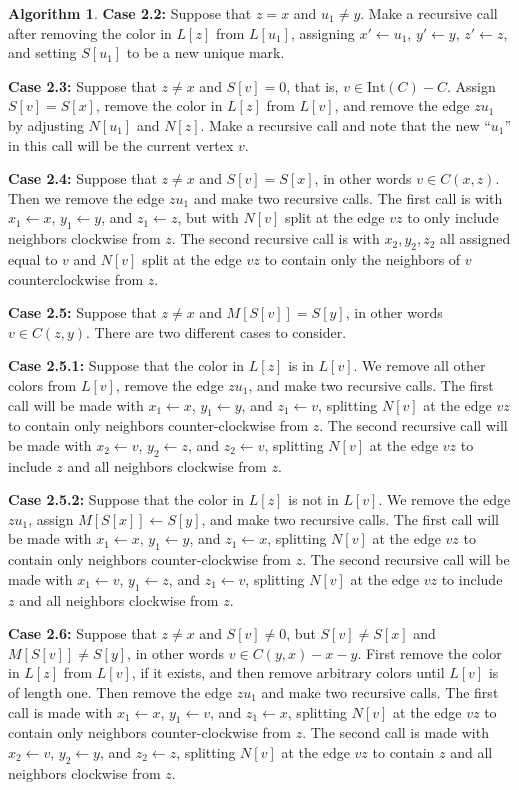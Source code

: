 \documentclass[12pt,letterpaper]{article}
\theoremstyle{plain}
\theoremstyle{definition}
\theoremstyle{break}
\newtheorem{algorithm}[lemma]{Algorithm}     %
\begin{document}
\begin{algorithm}
\textbf{Case 2.2:} Suppose that $z=x$ and $u_1\ne y$. Make a recursive call after
removing the color in $L[z]$ from $L[u_1]$,
assigning $x'\leftarrow u_1$,
$y'\leftarrow y$, $z'\leftarrow z$,
and setting $S[u_1]$ to be a new unique mark.

\textbf{Case 2.3:} Suppose that $z\ne x$ and $S[v]=0$, that is, $v\in
\text{Int}(C)-C$. Assign $S[v]=S[x]$, remove the color in $L[z]$ from
$L[v]$, and remove the edge $zu_1$ by adjusting
$N[u_1]$ and $N[z]$. Make a recursive call and note that the new
``$u_1$'' in this call will be the current vertex $v$.

\textbf{Case 2.4:} Suppose that $z\ne x$ and $S[v]=S[x]$, in other
words $v\in C(x,z)$. Then we remove
the edge $zu_1$ and make two
recursive calls. The first call is with $x_1\leftarrow x$,
$y_1\leftarrow y$, and $z_1\leftarrow z$, 
but with $N[v]$ split at the edge $vz$ to only include neighbors clockwise
from $z$. The second recursive call is 
with $x_2,y_2,z_2$ all assigned equal to $v$ and $N[v]$ split at the edge
$vz$ to contain only the neighbors of $v$ counterclockwise from $z$.

\textbf{Case 2.5:} Suppose that $z\ne x$ and $M[S[v]]=S[y]$, in other words
$v\in C(z,y)$. There are
two different cases to consider.

\textbf{Case 2.5.1:} Suppose that the color in $L[z]$ is in $L[v]$. We
remove all other colors from $L[v]$, remove the edge $zu_1$, and make two
recursive calls. The first call will be made with $x_1\leftarrow x$,
$y_1\leftarrow y$, and $z_1\leftarrow v$, splitting $N[v]$ at the edge
$vz$ to contain only neighbors counter-clockwise from $z$. The second
recursive call will be made with $x_2\leftarrow v$, $y_2\leftarrow z$,
and $z_2\leftarrow v$, splitting $N[v]$ at the edge $vz$ to include $z$
and all neighbors clockwise from $z$.

\textbf{Case 2.5.2:} Suppose that the color in $L[z]$ is not in $L[v]$.
We remove the edge $zu_1$, assign $M[S[x]]\leftarrow S[y]$, and make two recursive
calls. The first call
will be made with $x_1\leftarrow x$,
$y_1\leftarrow y$, and $z_1\leftarrow x$, splitting $N[v]$ at the edge
$vz$ to contain only neighbors counter-clockwise from $z$. The second
recursive call will be made with $x_1\leftarrow v$, $y_1\leftarrow z$,
and $z_1\leftarrow v$, splitting $N[v]$ at the edge $vz$ to include $z$
and all neighbors clockwise from $z$.

\textbf{Case 2.6:} Suppose that $z\ne x$ and $S[v]\ne 0$, but
$S[v]\ne S[x]$ and $M[S[v]]\ne S[y]$, in other words $v\in C(y,x)-x-y$.
First remove the color in $L[z]$ from $L[v]$, if it exists, and then remove
arbitrary colors until $L[v]$ is of length one. Then remove the edge $zu_1$
and make two recursive calls.
The first call is made with $x_1\leftarrow x$,
$y_1\leftarrow v$, and $z_1\leftarrow x$, splitting $N[v]$ at the edge $vz$
to contain only neighbors counter-clockwise from $z$.
The second call is
made with $x_2\leftarrow v$, $y_2\leftarrow y$, and $z_2\leftarrow z$,
splitting $N[v]$ at the edge $vz$ to contain $z$ and all neighbors clockwise
from $z$.
\end{algorithm}
\end{document}
